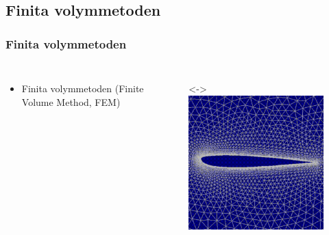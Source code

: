 \subsection{Finita volymmetoden}


\begin{frame}
\frametitle{Finita volymmetoden}
\begin{columns}[c]

\begin{itemize}[<+(1)->]
\item Finita volymmetoden (Finite Volume Method, FEM)
    \setcounter{fvmpauses}{\thebeamerpauses}
\end{itemize}


\begin{figure}
\centering
\uncover<\thefvmpauses->{
\includegraphics[width=.5\textwidth]{../Presentation/Images/Attribute/Grid/Zhukovskii_profile_by_NASA}
}
\\
\allowbreak 
\end{figure}

\end{columns}
\end{frame}